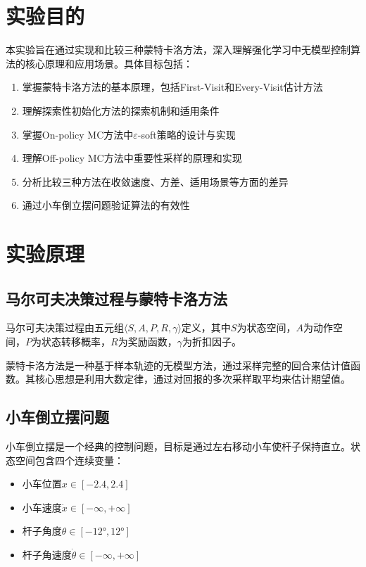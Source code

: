 \documentclass[12pt,a4paper]{article}
\begin{document}
\section{实验目的}

本实验旨在通过实现和比较三种蒙特卡洛方法，深入理解强化学习中无模型控制算法的核心原理和应用场景。具体目标包括：

\begin{enumerate}
    \item 掌握蒙特卡洛方法的基本原理，包括First-Visit和Every-Visit估计方法
    \item 理解探索性初始化方法的探索机制和适用条件
    \item 掌握On-policy MC方法中$\varepsilon$-soft策略的设计与实现
    \item 理解Off-policy MC方法中重要性采样的原理和实现
    \item 分析比较三种方法在收敛速度、方差、适用场景等方面的差异
    \item 通过小车倒立摆问题验证算法的有效性
\end{enumerate}

\section{实验原理}

\subsection{马尔可夫决策过程与蒙特卡洛方法}

马尔可夫决策过程由五元组$\langle S, A, P, R, \gamma \rangle$定义，其中$S$为状态空间，$A$为动作空间，$P$为状态转移概率，$R$为奖励函数，$\gamma$为折扣因子。

蒙特卡洛方法是一种基于样本轨迹的无模型方法，通过采样完整的回合来估计值函数。其核心思想是利用大数定律，通过对回报的多次采样取平均来估计期望值。

\subsection{小车倒立摆问题}

小车倒立摆是一个经典的控制问题，目标是通过左右移动小车使杆子保持直立。状态空间包含四个连续变量：
\begin{itemize}
    \item 小车位置$x \in [-2.4, 2.4]$
    \item 小车速度$\dot{x} \in [-\infty, +\infty]$
    \item 杆子角度$\theta \in [-12°, 12°]$
    \item 杆子角速度$\dot{\theta} \in [-\infty, +\infty]$
\end{itemize}
\end{document}
